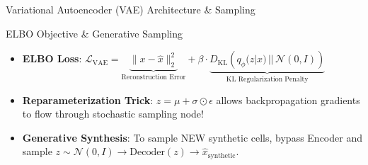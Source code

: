 \begin{frame}{Variational Autoencoder (VAE) Architecture \& Sampling}
    \vspace{0mm}
    \begin{block}{ELBO Objective \& Generative Sampling}
        \fontsize{7pt}{8.5pt}\selectfont
        \begin{itemize}
            \item \textbf{ELBO Loss}: $\mathcal{L}_{\text{VAE}} = \underbrace{\|x - \hat{x}\|_2^2}_{\text{Reconstruction Error}} + \beta \cdot \underbrace{D_{\text{KL}}\left(q_\phi(z|x) \,||\, \mathcal{N}(0, I)\right)}_{\text{KL Regularization Penalty}}$
            \item \textbf{Reparameterization Trick}: $z = \mu + \sigma \odot \epsilon$ allows backpropagation gradients to flow through stochastic sampling node!
            \item \textbf{Generative Synthesis}: To sample NEW synthetic cells, bypass Encoder and sample $z \sim \mathcal{N}(0, I) \to \text{Decoder}(z) \to \hat{x}_{\text{synthetic}}$.
        \end{itemize}
    \end{block}
\end{frame}


